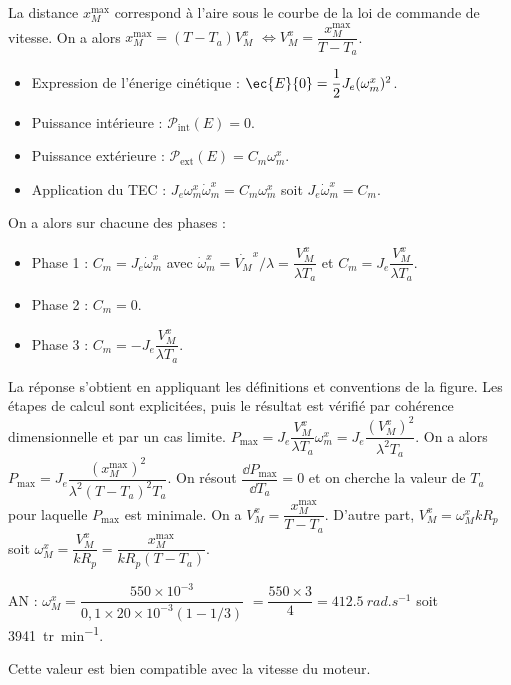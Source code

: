 \begin{corrigebox}
La distance  $x_M^{\text{max}}$ correspond à l'aire sous le courbe de la loi de commande de vitesse.
On a alors 
 $x_M^{\text{max}} = \left(T-T_a\right)V_M^x$ 
 $ \Longleftrightarrow V_M^x=\dfrac{x_M^{\text{max}}}{T-T_a}$.
\begin{itemize}
\item Expression de l'énerige cinétique : $\ec{E}{0}=\dfrac{1}{2}J_e (\omega_m^x)^2$.
\item Puissance intérieure : $\mathcal{P}_{\text{int}}(E)=0$.
\item Puissance extérieure : $\mathcal{P}_{\text{ext}}(E)=C_m\omega_m^x$.
\item Application du TEC : $J_e \omega_m^x \dot{\omega}_m^x = C_m\omega_m^x$ soit $J_e  \dot{\omega}_m^x = C_m$.
\end{itemize}
\vspace{.25cm}

On a alors sur chacune des phases : 

\begin{itemize}
\item Phase 1 : $C_m=J_e  \dot{\omega}_m^x$ avec $\dot{\omega}_m^x = \dot{V_M}^x /  \lambda= \dfrac{V_M^x}{ \lambda T_a}$ et $C_m = J_e \dfrac{V_M^x}{\lambda T_a}$.
\item Phase 2 : $C_m=0$.
\item Phase 3 : $C_m = - J_e  \dfrac{V_M^x}{\lambda T_a}$.
\end{itemize}
La réponse s'obtient en appliquant les définitions et conventions de la
    figure. Les étapes de calcul sont explicitées, puis le résultat est vérifié par
    cohérence dimensionnelle et par un cas limite.
$P_{\text{max}} = J_e \dfrac{V_M^x}{\lambda T_a}  {\omega}_m^x =J_e \dfrac{(V_M^x)^2}{\lambda^2 T_a}$.
On a alors 
$P_{\text{max}} =J_e \dfrac{\left({x_M^{\text{max}}}\right)^2}{\lambda^2 \left({T-T_a}\right)^2 T_a}$.
On résout $\dfrac{\dd P_{\text{max}}}{\dd T_a} = 0$ et on cherche la valeur de $T_a$ pour laquelle 
$P_{\text{max}}$ est minimale.
On a  $V_M^x=\dfrac{x_M^{\text{max}}}{T-T_a}$. D'autre part, 
$V_M^x = \omega_M^x  k R_p $ soit $\omega_M^x  = \dfrac{V_M^x}{ k R_p} =  \dfrac{{x_M^{\text{max}}}}{ k R_p\left({T-T_a} \right)} $.

AN : $\omega_M^x  = \dfrac{550\times 10^{-3}}{ 0,1 \times 20 \times 10^{-3} \left(1-1/3 \right)} $
$ =  \dfrac{550\times 3}{ 4}= \SI{412,5}{rad.s^{-1}} $ soit \SI{3941}{tr.min^{-1}}.

Cette valeur est bien compatible avec la vitesse du moteur.
\end{corrigebox}
